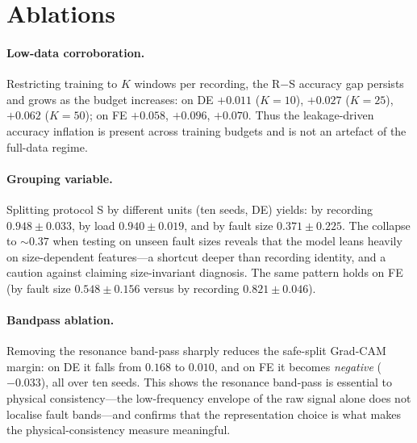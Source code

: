 \documentclass[11pt]{article}
\begin{document}
\section{Ablations}
\paragraph{Low-data corroboration.}
Restricting training to $K$ windows per recording, the R$-$S accuracy gap persists and
grows as the budget increases: on DE $+0.011$ ($K{=}10$), $+0.027$ ($K{=}25$), $+0.062$
($K{=}50$); on FE $+0.058$, $+0.096$, $+0.070$. Thus the leakage-driven accuracy inflation
is present across training budgets and is not an artefact of the full-data regime.

\paragraph{Grouping variable.}
Splitting protocol S by different units (ten seeds, DE) yields: by recording
$0.948\pm0.033$, by load $0.940\pm0.019$, and by fault size $0.371\pm0.225$. The collapse
to $\sim0.37$ when testing on unseen fault sizes reveals that the model leans heavily on
size-dependent features---a shortcut deeper than recording identity, and a caution against
claiming size-invariant diagnosis. The same pattern holds on FE (by fault size
$0.548\pm0.156$ versus by recording $0.821\pm0.046$).

\paragraph{Bandpass ablation.}
Removing the resonance band-pass sharply reduces the safe-split Grad-CAM margin: on DE it
falls from $0.168$ to $0.010$, and on FE it becomes \emph{negative} ($-0.033$), all over
ten seeds. This shows the resonance band-pass is essential to physical
consistency---the low-frequency envelope of the raw signal alone does not localise fault
bands---and confirms that the representation choice is what makes the physical-consistency
measure meaningful.
\end{document}
